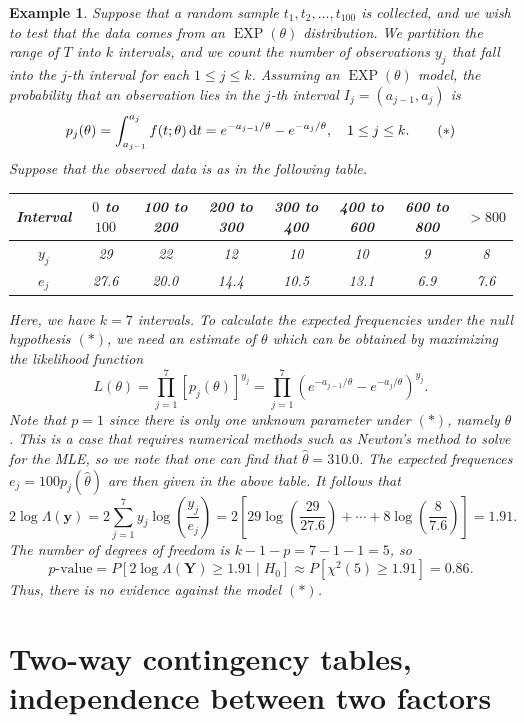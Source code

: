\documentclass[10pt]{article}
\newcommand{\dd}{\,{\rm d}}
\DeclareMathOperator{\EXP}{EXP}
\theoremstyle{newstyle}
\newtheorem{exmp}[thm]{Example}
\begin{document}
\begin{exmp}
Suppose that a random sample $t_1, t_2, \dots, t_{100}$ is collected, and we wish to test that the 
data comes from an $\EXP(\theta)$ distribution. We partition the range of $T$ into $k$ intervals, 
and we count the number of observations $y_j$ that fall into the $j$-th interval for each $1 \leq j \leq k$.
Assuming an $\EXP(\theta)$ model, the probability that an observation lies in the $j$-th interval 
$I_j = (a_{j-1}, a_j)$ is 
\[ p_j(\theta) = \int_{a_{j-1}}^{a_j} f(t; \theta)\dd t = e^{-a_{j-1}/\theta} - e^{-a_j/\theta}, 
\quad 1 \leq j \leq k. \tag{$*$} \]
Suppose that the observed data is as in the following table. 
\begin{table}[h]
\centering
\begin{tabular}{|c|c|c|c|c|c|c|c|}
\hline
Interval & $0$ to $100$ & 100 to 200 & 200 to 300 & 300 to 400 & 400 to 600 & 600 to 800 & $>800$ \\ \hline
$y_j$    & 29           & 22         & 12         & 10         & 10         & 9          & 8      \\ \hline
$e_j$    & 27.6         & 20.0       & 14.4       & 10.5       & 13.1       & 6.9        & 7.6    \\ \hline
\end{tabular}
\end{table}
Here, we have $k = 7$ intervals. To calculate the expected frequencies under the null hypothesis 
$(*)$, we need an estimate of $\theta$ which can be obtained by maximizing the likelihood function 
\[ L(\theta) = \prod_{j=1}^7 [p_j(\theta)]^{y_j} = \prod_{j=1}^7 (e^{-a_{j-1}/\theta} - e^{-a_j/\theta})^{y_j}. \]
Note that $p = 1$ since there is only one unknown parameter under $(*)$, namely $\theta$. 
This is a case that requires numerical methods such as Newton's method to solve for the MLE, so 
we note that one can find that $\hat\theta = 310.0$. The expected frequences $e_j 
= 100p_j(\hat\theta)$ are then given in the above table. It follows that 
\[ 2\log\Lambda(\mathbf y) = 2\sum_{j=1}^7 y_j \log \left( \frac{y_j}{e_j} \right) 
= 2 \left[ 29 \log \left( \frac{29}{27.6} \right) + \cdots + 8 \log \left( \frac{8}{7.6} \right) \right] 
= 1.91. \]
The number of degrees of freedom is $k-1-p = 7-1-1 = 5$, so 
\[ \text{$p$-value} = P[2\log\Lambda(\mathbf Y) \geq 1.91 \mid H_0] \approx P[\chi^2(5) \geq 1.91] 
= 0.86. \]
Thus, there is no evidence against the model $(*)$. 
\end{exmp}

\newpage 
\section{Two-way contingency tables, independence between two factors}
\end{document}
